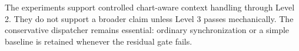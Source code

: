 The experiments support controlled chart-aware context handling through Level 2. They do not support a broader claim unless Level 3 passes mechanically. The conservative dispatcher remains essential: ordinary synchronization or a simple baseline is retained whenever the residual gate fails.
